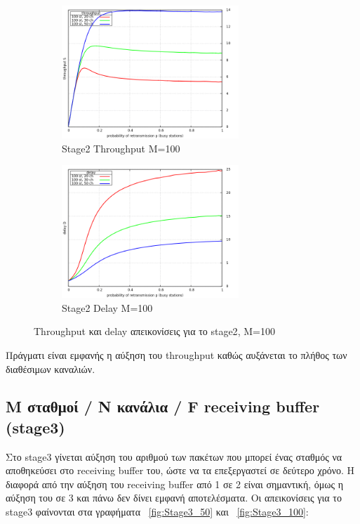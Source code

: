 \documentclass[12pt]{report}
\begin{document}
\begin{figure}[h]
\begin{subfigure}{0.5\textwidth}
\includegraphics[width=0.9\linewidth, height=5cm]{st2_throughput_M100} 
\caption{\textlatin{Stage2 Throughput M=100}}
\label{fig:st2_throughput_100}
\end{subfigure}
\begin{subfigure}{0.5\textwidth}
\includegraphics[width=0.9\linewidth, height=5cm]{st2_delay_M100}
\caption{\textlatin{Stage2 Delay M=100}}
\label{fig:st2_delay_100}
\end{subfigure}
 
\caption{\textlatin{Throughput} και \textlatin{delay} απεικονίσεις για το \textlatin{stage2}, M=100}
\label{fig:Stage2_100}
\end{figure}
Πράγματι είναι εμφανής η αύξηση του \textlatin{throughput} καθώς αυξάνεται το πλήθος των διαθέσιμων καναλιών.

\subsection{\textlatin{M} σταθμοί / \textlatin{N} κανάλια / \textlatin{F} \textlatin{receiving buffer} (\textlatin{stage3})}
Στο \textlatin{stage3} γίνεται αύξηση του αριθμού των πακέτων που μπορεί ένας σταθμός να αποθηκεύσει στο \textlatin{receiving buffer} του, ώστε να τα επεξεργαστεί σε δεύτερο χρόνο. Η διαφορά από την αύξηση του \textlatin{receiving buffer} από 1 σε 2 είναι σημαντική, όμως η αύξηση του σε 3 και πάνω δεν δίνει εμφανή αποτελέσματα. Οι απεικονίσεις για το \textlatin{stage3} φαίνονται στα γραφήματα ~\ref{fig:Stage3_50} και ~\ref{fig:Stage3_100}:
\end{document}
